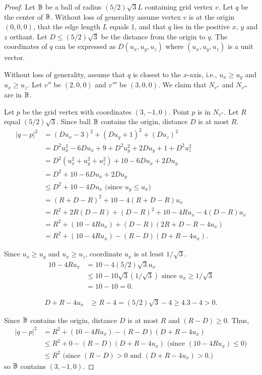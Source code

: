 \begin{proof}
Let $\mathbb{B}$ be a ball of radius $(5/2)\sqrt{3}L$ containing grid vertex $v$.
Let $q$ be the center of $\mathbb{B}$.
Without loss of generality assume vertex $v$ is at the origin $(0,0,0)$,
that the edge length $L$ equals 1,
and that $q$ lies in the positive $x$, $y$ and $z$ orthant.
Let $D \le (5/2) \sqrt{3}$ be the distance from the origin to $q$.
The coordinates of $q$ can be expressed as $D(u_x,u_y,u_z)$
where $(u_x,u_y,u_z)$ is a unit vector.

Without loss of generality, assume that $q$ is closest to the $x$-axis,
i.e., $u_x \ge u_y$ and $u_x \ge u_z$.
Let $v''$ be $(2,0,0)$ and $v'''$ be $(3,0,0)$.
We claim that $N_{v''}$ and $N_{v'''}$ are in $\mathbb{B}$.

Let $p$ be the grid vertex with coordinates $(3,-1,0)$.
Point $p$ is in $N_{v''}$.
Let $R$ equal $(5/2)\sqrt{3}$.
Since ball $\mathbb{B}$ contains the origin,
distance $D$ is at most $R$.
\begin{align*}
|q-p|^2 & = (D u_x-3)^2 + (D u_y+1)^2 + (D u_z)^2 \\
 & = D^2 u_x^2 - 6 D u_x + 9 + D^2 u_y^2 + 2 D u_y + 1 + D^2 u_z^2 \\
 & = D^2 (u_x^2 + u_y^2 + u_z^2) + 10 - 6 D u_x + 2 D u_y \\
 & = D^2 + 10 - 6 D u_x + 2 D u_y \\
 & \le D^2 + 10 - 4 D u_x \mbox{  (since $u_y \le u_x$)} \\
 & = (R + D-R)^2 +10 - 4 (R + D-R) u_x \\
 & = R^2 + 2R(D-R) + (D-R)^2 + 10 - 4R u_x - 4 (D-R) u_x \\
 & = R^2 + (10 - 4R u_x) + (D-R)(2R + D-R - 4 u_x) \\
 & = R^2 + (10 - 4R u_x) - (R-D) (D+R - 4 u_x).
\end{align*}

Since $u_x \ge u_y$ and $u_x \ge u_z$, 
coordinate $u_x$ is at least $1/\sqrt{3}$.
\begin{align*}
10 - 4 Ru_x & = 10 - 4 (5/2) \sqrt{3} u_x \\
 & \le 10 - 10 \sqrt{3} (1/\sqrt{3}) \mbox{ since $u_x \ge 1/\sqrt{3}$} \\
 & = 10 - 10 = 0.
\end{align*}

\begin{align*}
D + R - 4u_x & \ge R - 4 = (5/2)\sqrt{3} - 4 \ge 4.3 - 4 > 0.
\end{align*}

Since $\mathbb{B}$ contains the origin,
distance $D$ is at most $R$ and $(R-D) \ge 0$.
Thus,
\begin{align*}
|q-p|^2 & = R^2 + (10 - 4R u_x) - (R-D) (D+R - 4 u_x) \\
   & \le R^2 + 0 - (R-D) (D+R - 4 u_x) \mbox{  (since $(10-4Ru_x) \le 0$)} \\
   & \le R^2 \mbox{  (since $(R-D)>0$ and $(D+R-4u_x)>0$.)}
\end{align*}
so $\mathbb{B}$ contains $(3,-1,0)$.


\end{proof}
